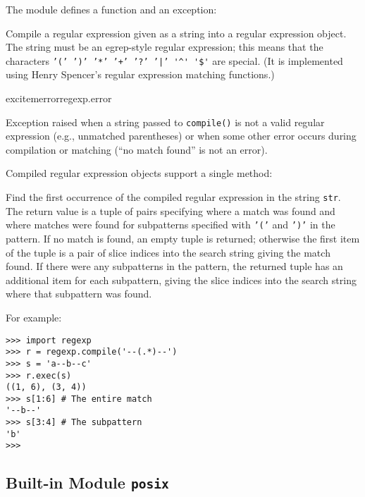 The module defines a function and an exception:

\begin{description}


Compile a regular expression given as a string into a regular
expression object.
The string must be an egrep-style regular expression;
this means that the characters
{\tt '(' ')' '*' '+' '?'\ '|' }\verb='^' '$'=
are special.
(It is implemented using Henry Spencer's regular expression matching
functions.)

excitem{error}{regexp.error}

Exception raised when a string passed to {\tt compile()} is not a
valid regular expression (e.g., unmatched parentheses) or when some other
error occurs during compilation or matching
(``no match found'' is not an error).

\end{description}

Compiled regular expression objects support a single method:

\begin{description}


Find the first occurrence of the compiled regular expression in the
string {\tt str}.
The return value is a tuple of pairs specifying where a match was
found and where matches were found for subpatterns specified with
{\tt '('} and {\tt ')'} in the pattern.
If no match is found, an empty tuple is returned; otherwise the first
item of the tuple is a pair of slice indices into the search string
giving the match found.
If there were any subpatterns in the pattern, the returned tuple has an
additional item for each subpattern, giving the slice indices into the
search string where that subpattern was found.

\end{description}

For example:
\bcode\begin{verbatim}
>>> import regexp
>>> r = regexp.compile('--(.*)--')
>>> s = 'a--b--c'
>>> r.exec(s)
((1, 6), (3, 4))
>>> s[1:6] # The entire match
'--b--'
>>> s[3:4] # The subpattern
'b'
>>> 
\end{verbatim}\ecode

\subsection{Built-in Module {\tt posix}}


